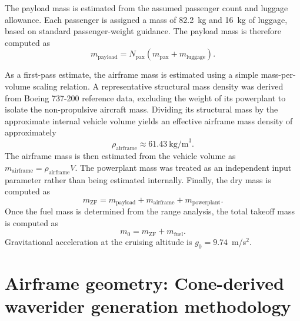 \documentclass[10pt,a4paper]{article}
\begin{document}
The payload mass is estimated from the assumed passenger count and luggage allowance. Each passenger is assigned a mass of 82.2~kg and 16~kg of luggage, based on standard passenger-weight guidance. The payload mass is therefore computed as
\begin{equation}
m_{\text{payload}} = N_{\text{pax}}\left(m_{\text{pax}} + m_{\text{luggage}}\right).
\end{equation}

As a first-pass estimate, the airframe mass is estimated using a simple mass-per-volume scaling relation. A representative structural mass density was derived from Boeing 737-200 reference data, excluding the weight of its powerplant to isolate the non-propulsive aircraft mass. Dividing its structural mass by the approximate internal vehicle volume yields an effective airframe mass density of approximately
\begin{equation}
\rho_{\text{airframe}} \approx 61.43~\text{kg/m}^3.
\end{equation}
The airframe mass is then estimated from the vehicle volume as $m_{\text{airframe}} = \rho_{\text{airframe}} V$. The powerplant mass was treated as an independent input parameter rather than being estimated internally. Finally, the dry mass is computed as
\begin{equation}
m_{\text{ZF}} = m_{\text{payload}} + m_{\text{airframe}} + m_{\text{powerplant}}.
\end{equation}
Once the fuel mass is determined from the range analysis, the total takeoff mass is computed as
\begin{equation}
m_{0} = m_{\text{ZF}} + m_{\text{fuel}}.
\end{equation}
Gravitational acceleration at the cruising altitude is $g_0=9.74$~m/s$^2$.

\section{Airframe geometry: Cone-derived waverider generation methodology}\label{sec:geometry}
\end{document}
